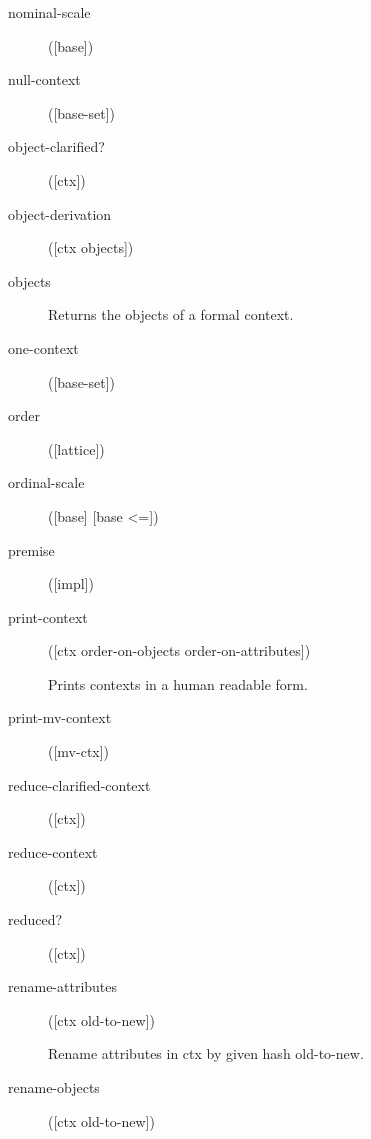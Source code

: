 \begin{description}
  \item[nominal-scale]
([base])



  \item[null-context]
([base-set])



  \item[object-clarified?]
([ctx])



  \item[object-derivation]
([ctx objects])



  \item[objects]


Returns the objects of a formal context.

  \item[one-context]
([base-set])



  \item[order]
([lattice])



  \item[ordinal-scale]
([base] [base <=])



  \item[premise]
([impl])



  \item[print-context]
([ctx order-on-objects order-on-attributes])

Prints contexts in a human readable form.

  \item[print-mv-context]
([mv-ctx])



  \item[reduce-clarified-context]
([ctx])



  \item[reduce-context]
([ctx])



  \item[reduced?]
([ctx])



  \item[rename-attributes]
([ctx old-to-new])

Rename attributes in ctx by given hash old-to-new.

  \item[rename-objects]
([ctx old-to-new])


\end{description}
